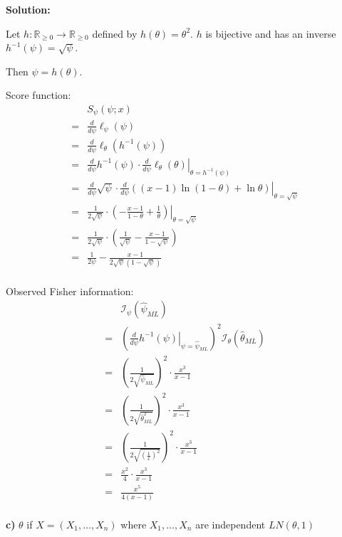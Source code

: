\documentclass{article}
\begin{document}
\textbf{Solution:}
\begin{ssolution}
Let \(h : \mathbb{R}_{\geq 0} \to \mathbb{R}_{\geq 0}\) defined by \(h(\theta) = \theta^2\).
\(h\) is bijective and has an inverse \(h^{-1}(\psi) = \sqrt{\psi}\).

Then \(\psi = h(\theta)\).

Score function:
\begin{align*}
	& S_\psi(\psi;x) \\
	=& \frac{d}{d\psi}\ell_\psi(\psi) \\
	=& \frac{d}{d\psi}\ell_\theta(h^{-1}(\psi)) \\
	=& \frac{d}{d \psi} h^{-1}(\psi) \cdot \left.\frac{d}{d\psi}\ell_\theta(\theta)\right|_{\theta=h^{-1}(\psi)} \\
	=& \frac{d}{d \psi} \sqrt{\psi} \cdot \left.\frac{d}{d\psi}\left((x-1)\ln(1-\theta)+\ln{\theta}\right)\right|_{\theta=\sqrt{\psi}} \\
	=& \frac{1}{2\sqrt{\psi}} \cdot \left.\left(-\frac{x-1}{1-\theta} + \frac{1}{\theta}\right)\right|_{\theta=\sqrt{\psi}} \\
	=& \frac{1}{2\sqrt{\psi}} \cdot \left(\frac{1}{\sqrt{\psi}}-\frac{x-1}{1-\sqrt{\psi}}\right) \\
	=& \frac{1}{2\psi}-\frac{x-1}{2\sqrt{\psi}(1-\sqrt{\psi})} \\
\end{align*}

Observed Fisher information:
\begin{align*}
	& \mathcal{I}_\psi(\hat{\psi}_{ML}) \\
	=& \left(\left.\frac{d}{d\psi}h^{-1}(\psi)\right|_{\psi=\hat{\psi}_{ML}}\right)^2\mathcal{I}_\theta(\hat{\theta}_{ML}) \\
	=& \left(\frac{1}{2\sqrt{\hat{\psi}_{ML}}}\right)^2\cdot \frac{x^3}{x-1} \\
	=& \left(\frac{1}{2\sqrt{\hat{\theta}_{ML}^2}}\right)^2\cdot \frac{x^3}{x-1} \\
	=& \left(\frac{1}{2\sqrt{(\frac{1}{x})^2}}\right)^2\cdot \frac{x^3}{x-1} \\
	=& \frac{x^2}{4}\cdot \frac{x^3}{x-1} \\
	=& \frac{x^5}{4(x-1)} \\
\end{align*}
\end{ssolution}

\begin{ssubproblem}
\textbf{c)}
\(\theta\) if \(X = (X_1,\ldots,X_n)\) where \(X_1,\ldots,X_n\)
are independent \(LN(\theta,1)\)
\end{ssubproblem}
\end{document}
